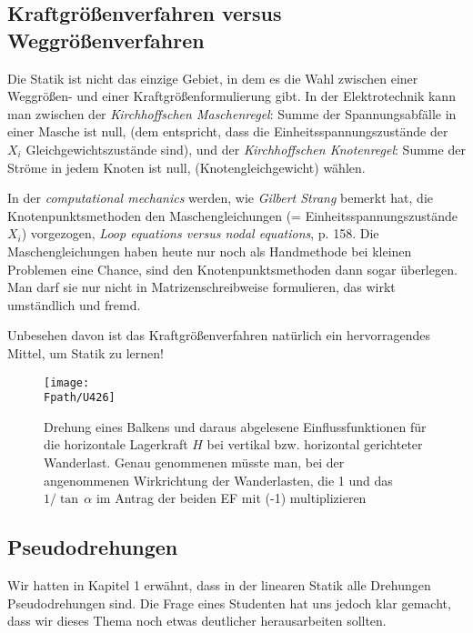 \textcolor{sectionTitleBlue}{\section{Kraftgr\"{o}{\ss}enverfahren versus Weggr\"{o}{\ss}enverfahren}}
Die Statik ist nicht das einzige Gebiet, in dem es die Wahl zwischen einer Weggr\"{o}{\ss}en- und einer Kraftgr\"{o}{\ss}enformulierung gibt. In der Elektrotechnik kann man zwischen der {\em Kirchhoffschen Maschenregel\/}: Summe der Spannungsabf\"{a}lle in einer Masche ist null, (dem entspricht, dass die Einheitsspannungszust\"{a}nde der $X_i$ Gleichgewichtszust\"{a}nde sind), und der {\em Kirchhoffschen Knotenregel\/}: Summe der Str\"{o}me in jedem Knoten ist null, (\glq Knotengleichgewicht\grq{}) w\"{a}hlen.

In der {\em computational mechanics\/} werden, wie {\em Gilbert Strang\/} bemerkt hat, die Knotenpunktsmethoden den Maschengleichungen (= Einheitsspannungszust\"{a}nde $X_i$) vorgezogen, {\em \glq Loop equations versus nodal equations\grq{}\/}, \cite{Strang4} p. 158. Die Maschengleichungen haben heute nur noch als Handmethode bei kleinen Problemen eine Chance, sind den Knotenpunktsmethoden dann sogar \"{u}berlegen. Man darf sie nur nicht  in Matrizenschreibweise formulieren, das wirkt umst\"{a}ndlich und fremd.

Unbesehen davon ist das Kraftgr\"{o}{\ss}enverfahren nat\"{u}rlich ein hervorragendes Mittel, um Statik zu lernen!

\begin{figure}[tbp]
\centering
\if {} \sidecaption \fi
\texttt{[image: \\Fpath/U426]}
\caption{Drehung eines Balkens und daraus abgelesene Einflussfunktionen f\"{u}r die horizontale Lagerkraft $H$ bei vertikal bzw. horizontal gerichteter Wanderlast. Genau genommenen m\"{u}sste man, bei der angenommenen Wirkrichtung der Wanderlasten, die 1 und das $1/\tan\, \alpha$ im Antrag der beiden EF mit  (-1) multiplizieren } \label{U426}
\end{figure}%
\textcolor{sectionTitleBlue}{\section{Pseudodrehungen}}\label{Korrektur33}
Wir hatten in Kapitel 1 erw\"{a}hnt, dass in der linearen Statik alle Drehungen Pseudodrehungen sind. Die Frage eines Studenten hat uns jedoch klar gemacht, dass wir dieses Thema noch etwas deutlicher herausarbeiten sollten.

